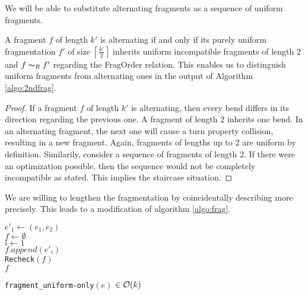 We will be able to substitute alternating fragments as a sequence of uniform fragments.
\begin{lemma}
	A fragment $f$ of length $k'$ is alternating if and only if its purely uniform fragmentation $f'$ of size $\left\lceil\frac{k'}{2}\right\rceil$ inherits uniform incompatible fragments of length 2 and $f \thicksim_R f'$ regarding the FragOrder relation. This enables us to distinguish uniform fragments from alternating ones in the output of Algorithm \ref{algo:2ndfrag}.\label{lem:alt_2uni}
\end{lemma}
\begin{proof}
	If a fragment $f$ of length $k'$ is alternating, then every bend differs in its direction regarding the previous one. A fragment of length 2 inherits one bend. In an alternating fragment, the next one will cause a turn property collision, resulting in a new fragment. Again, fragments of lengths up to 2 are uniform by definition. Similarily, consider a sequence of fragments of length 2. If there were an optimization possible, then the sequence would not be completely incompatible as stated. This implies the staircase situation.
\end{proof}
We are willing to lengthen the fragmentation by coincidentally describing more precisely. This leads to a modification of algorithm \ref{algo:frag}.\\
\begin{algorithm}[H]
	$e'_1 \gets (e_1,e_2)$\\
	$f \gets \emptyset$\\
	$i \gets 1$\\
	$f.append(e'_i)$\\
	\texttt{Recheck}$(f)$\label{algo:2ndfrag_recheck}\\
	\Return $f$
	\caption{\texttt{fragment\_uniform-only}$(e)$ $\in \mathcal{O}(k)$}\label{algo:2ndfrag}
\end{algorithm}
